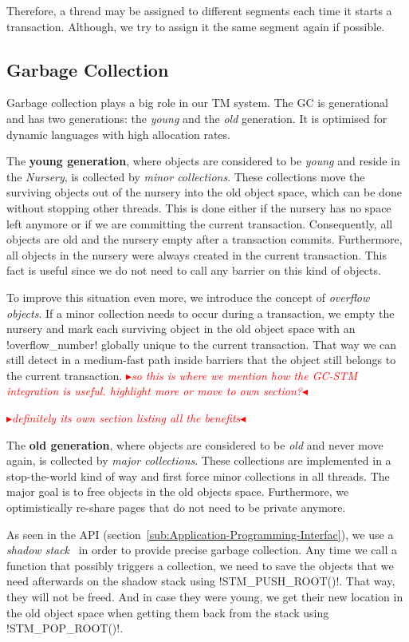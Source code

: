 \documentclass{sigplanconf}
\makeatletter
\renewcommand\lstinline[1][]{%
  \Collectverb{\@@myverb}%
}
\def\@@myverb#1{%
    \begingroup
    \fboxsep=0.2em
    \colorbox{verylightgray}{\oldlstinline|#1|}%
    \endgroup
}
\newcommand{\mynote}[2]{%
  \textcolor{red}{%
    \fbox{\bfseries\sffamily\scriptsize#1}%
    {\small$\blacktriangleright$\textsf{\emph{#2}}$\blacktriangleleft$}%
  }%
}
\newcommand\remi[1]{\mynote{Remi}{#1}}
\newcommand\cfbolz[1]{\mynote{cfbolz}{#1}}
\makeatother
\begin{document}
Therefore, a thread may be assigned to different segments each time it
starts a transaction. Although, we try to assign it the same segment
again if possible.




\subsection{Garbage Collection}

Garbage collection plays a big role in our TM system. The GC is
generational and has two generations: the \emph{young} and the
\emph{old} generation. It is optimised for dynamic languages with
high allocation rates.

The \textbf{young generation}, where objects are considered to be
\emph{young} and reside in the \emph{Nursery}, is collected by
\emph{minor collections}. These collections move the surviving objects
out of the nursery into the old object space, which can be done
without stopping other threads. This is done either if the nursery has
no space left anymore or if we are committing the current
transaction. Consequently, all objects are old and the nursery empty
after a transaction commits.  Furthermore, all objects in the nursery
were always created in the current transaction. This fact is useful
since we do not need to call any barrier on this kind of objects.

To improve this situation even more, we introduce the concept of
\emph{overflow objects}. If a minor collection needs to occur during a
transaction, we empty the nursery and mark each surviving object in
the old object space with an \lstinline!overflow_number!  globally
unique to the current transaction. That way we can still detect in a
medium-fast path inside barriers that the object still belongs to the
current transaction. \remi{so this is where we mention how the GC-STM
integration is useful. highlight more or move to own section?}
\cfbolz{definitely its own section listing all the benefits}

The \textbf{old generation}, where objects are considered to be
\emph{old} and never move again, is collected by \emph{major
  collections}.  These collections are implemented in a stop-the-world
kind of way and first force minor collections in all threads. The
major goal is to free objects in the old objects space. Furthermore,
we optimistically re-share pages that do not need to be private
anymore.

As seen in the API (section~\ref{sub:Application-Programming-Interfac}),
we use a \emph{shadow stack}~\cite{fergus02} in order to provide precise garbage
collection.  Any time we call a function that possibly triggers a
collection, we need to save the objects that we need afterwards on the
shadow stack using \lstinline!STM_PUSH_ROOT()!.  That way, they will
not be freed. And in case they were young, we get their new location
in the old object space when getting them back from the stack using
\lstinline!STM_POP_ROOT()!.
\end{document}
